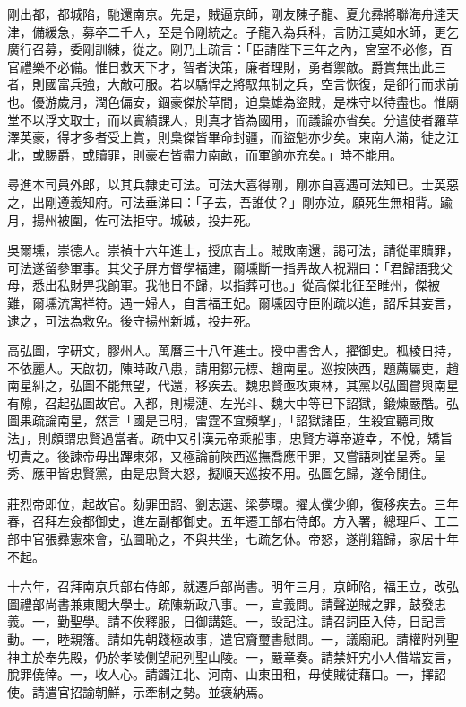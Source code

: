 \begin{pinyinscope}
剛出都，都城陷，馳還南京。先是，賊逼京師，剛友陳子龍、夏允彞將聯海舟達天津，備緩急，募卒二千人，至是令剛統之。子龍入為兵科，言防江莫如水師，更乞廣行召募，委剛訓練，從之。剛乃上疏言：「臣請陛下三年之內，宮室不必修，百官禮樂不必備。惟日救天下才，智者決策，廉者理財，勇者禦敵。爵賞無出此三者，則國富兵強，大敵可服。若以驕悍之將馭無制之兵，空言恢復，是卻行而求前也。優游歲月，潤色偏安，錮豪傑於草間，迫梟雄為盜賊，是株守以待盡也。惟廟堂不以浮文取士，而以實績課人，則真才皆為國用，而議論亦省矣。分遣使者羅草澤英豪，得才多者受上賞，則梟傑皆畢命封疆，而盜魁亦少矣。東南人滿，徙之江北，或賜爵，或贖罪，則豪右皆盡力南畝，而軍餉亦充矣。」時不能用。

尋進本司員外郎，以其兵隸史可法。可法大喜得剛，剛亦自喜遇可法知已。士英惡之，出剛遵義知府。可法垂涕曰：「子去，吾誰仗？」剛亦泣，願死生無相背。踰月，揚州被圍，佐可法拒守。城破，投井死。

吳爾壎，崇德人。崇禎十六年進士，授庶吉士。賊敗南還，謁可法，請從軍贖罪，可法遂留參軍事。其父子屏方督學福建，爾壎斷一指畀故人祝淵曰：「君歸語我父母，悉出私財畀我餉軍。我他日不歸，以指葬可也。」從高傑北征至睢州，傑被難，爾壎流寓祥符。遇一婦人，自言福王妃。爾壎因守臣附疏以進，詔斥其妄言，逮之，可法為救免。後守揚州新城，投井死。

高弘圖，字研文，膠州人。萬曆三十八年進士。授中書舍人，擢御史。柧棱自持，不依麗人。天啟初，陳時政八患，請用鄒元標、趙南星。巡按陜西，題薦屬吏，趙南星糾之，弘圖不能無望，代還，移疾去。魏忠賢亟攻東林，其黨以弘圖嘗與南星有隙，召起弘圖故官。入都，則楊漣、左光斗、魏大中等已下詔獄，鍛煉嚴酷。弘圖果疏論南星，然言「國是已明，雷霆不宜頻擊」，「詔獄諸臣，生殺宜聽司敗法」，則頗謂忠賢過當者。疏中又引漢元帝乘船事，忠賢方導帝遊幸，不悅，矯旨切責之。後諫帝毋出蹕東郊，又極論前陜西巡撫喬應甲罪，又嘗語刺崔呈秀。呈秀、應甲皆忠賢黨，由是忠賢大怒，擬順天巡按不用。弘圖乞歸，遂令閒住。

莊烈帝即位，起故官。劾罪田詔、劉志選、梁夢環。擢太僕少卿，復移疾去。三年春，召拜左僉都御史，進左副都御史。五年遷工部右侍郎。方入署，總理戶、工二部中官張彞憲來會，弘圖恥之，不與共坐，七疏乞休。帝怒，遂削籍歸，家居十年不起。

十六年，召拜南京兵部右侍郎，就遷戶部尚書。明年三月，京師陷，福王立，改弘圖禮部尚書兼東閣大學士。疏陳新政八事。一，宣義問。請聲逆賊之罪，鼓發忠義。一，勤聖學。請不俟釋服，日御講筵。一，設記注。請召詞臣入侍，日記言動。一，睦親籓。請如先朝踐極故事，遣官齎璽書慰問。一，議廟祀。請權附列聖神主於奉先殿，仍於孝陵側望祀列聖山陵。一，嚴章奏。請禁奸宄小人借端妄言，脫罪僥倖。一，收人心。請蠲江北、河南、山東田租，毋使賊徒藉口。一，擇詔使。請遣官招諭朝鮮，示牽制之勢。並褒納焉。


\end{pinyinscope}
